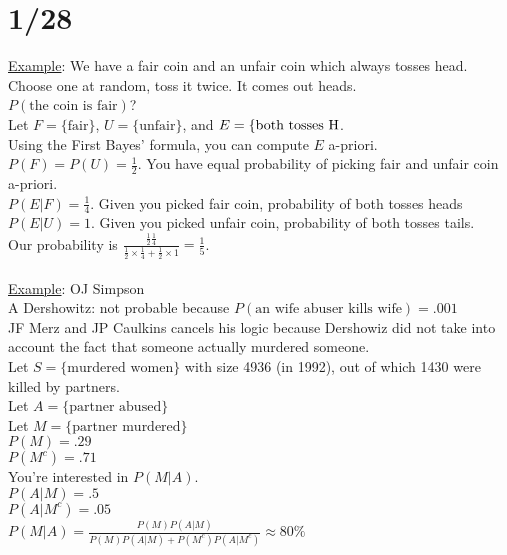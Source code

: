 \section*{1/28}
  \underline{Example}: We have a fair coin and an unfair coin which always 
    tosses head. Choose one at random, toss it twice. It comes out heads.\\
    $P(\text{the coin is fair})$?\\
    Let $F = \{\text{fair}\}$, $U = \{\text{unfair}\}$, and $E = \{
    \text{both tosses H\\}$.\\
    Using the First Bayes' formula, you can compute $E$ a-priori.\\
    $P(F) = P(U) = \frac{1}{2}$. You have equal probability of picking
    fair and unfair coin a-priori.\\
    $P(E|F) = \frac{1}{4}$. Given you picked fair coin, probability of both 
    tosses heads\\
    $P(E|U) = 1$. Given you picked unfair coin, probability of both tosses
    tails.\\
    Our probability is $\frac{\frac{1}{2}\frac{1}{4}}{\frac{1}{2}\times
    \frac{1}{4} + \frac{1}{2} \times 1} = \frac{1}{5}$.\\\\
  \underline{Example}: OJ Simpson\\
    A Dershowitz: not probable because $P(\text{an wife abuser kills wife}) =
    .001$\\
    JF Merz and JP Caulkins cancels his logic because Dershowiz did not take 
    into account the fact that someone actually murdered someone.\\
    Let $S = \{\text{murdered women}\}$ with size 4936 (in 1992), out of
    which 1430 were killed by partners.\\
    Let $A = \{\text{partner abused}\}$\\
    Let $M = \{\text{partner murdered}\}$\\
    $P(M) = .29$\\
    $P(M^c) = .71$\\
    You're interested in $P(M|A)$.\\
    $P(A | M) = .5$\\
    $P(A | M^c) = .05$\\
    $P(M|A) = \frac{P(M)P(A |M)}{P(M)P(A|M)+ P(M^c)P(A| M^c)} \approx 80\%$\\\\
